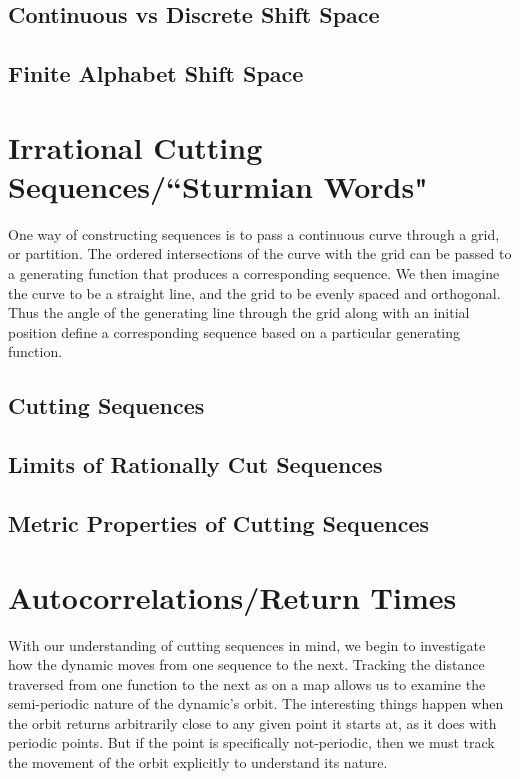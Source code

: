 \documentclass{article}
\begin{document}
\subsection{Continuous vs Discrete Shift Space}

\subsection{Finite Alphabet Shift Space}

\section{Irrational Cutting Sequences/``Sturmian Words"}

One way of constructing sequences is to pass a continuous curve through a grid, or partition. The ordered intersections of the curve with the grid can be passed to a generating function that produces a corresponding sequence. We then imagine the curve to be a straight line, and the grid to be evenly spaced and orthogonal. Thus the angle of the generating line through the grid along with an initial position define a corresponding sequence based on a particular generating function.

\subsection{Cutting Sequences}

\subsection{Limits of Rationally Cut Sequences}

\subsection{Metric Properties of Cutting Sequences}

\section{Autocorrelations/Return Times}

With our understanding of cutting sequences in mind, we begin to investigate how the dynamic moves from one sequence to the next. Tracking the distance traversed from one function to the next as on a map allows us to examine the semi-periodic nature of the dynamic's orbit. The interesting things happen when the orbit returns arbitrarily close to any given point it starts at, as it does with periodic points. But if the point is specifically not-periodic, then we must track the movement of the orbit explicitly to understand its nature.
\end{document}
